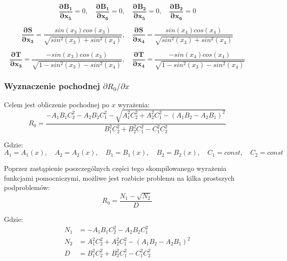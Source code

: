 \documentclass[10pt]{article}
\begin{document}
\begin{equation}
\boldsymbol{\frac{\partial B_1}{\partial x_5}} = 0, \quad
\boldsymbol{\frac{\partial B_1}{\partial x_6}} = 0, \quad
\boldsymbol{\frac{\partial B_2}{\partial x_5}} = 0, \quad
\boldsymbol{\frac{\partial B_2}{\partial x_6}} = 0
\end{equation}

\begin{equation}
\boldsymbol{\frac{\partial S}{\partial x_3}} = \frac{sin(x_3) cos(x_3)}{\sqrt{ sin^2(x_3) + sin^2(x_4)} }, \quad
\boldsymbol{\frac{\partial S}{\partial x_4}} = \frac{sin(x_4) cos(x_4)}{\sqrt{ sin^2(x_3) + sin^2(x_4)} }
\end{equation}

\begin{equation}
\boldsymbol{\frac{\partial T}{\partial x_3}} = \frac{-sin(x_3) cos(x_3)}{\sqrt{1 - sin^2(x_3) - sin^2(x_4)} }, \quad
\boldsymbol{\frac{\partial T}{\partial x_4}} = \frac{-sin(x_4) cos(x_4)}{\sqrt{1 - sin^2(x_3) - sin^2(x_4)} }
\end{equation}

\newpage
\subsubsection*{Wyznaczenie pochodnej $\partial R_0 / \partial x$}

Celem jest obliczenie pochodnej po $x$ wyrażenia:
\begin{equation}
R_0 = \frac{-A_1B_1C_2^2 -A_2B_2C_1^2 - 
\sqrt{A_1^2C_2^2 + A_2^2C_1^2 - ( A_1B_2 - A_2B_1)^2}}
{B_1^2C_2^2 + B_2^2C_1^2 - C_1^2C_2^2}
\end{equation}

Gdzie:
\begin{equation}
A_1 = A_1(x), \quad
A_2 = A_2(x), \quad
B_1 = B_1(x), \quad
B_2 = B_2(x), \quad
C_1 = const, \quad
C_2 = const
\end{equation}

Poprzez zastąpienie poszczególnych części tego skompilowanego wyrażenia funkcjami pomocniczymi, możliwe jest rozbicie problemu na kilka prostszych podproblemów:
\begin{equation}
R_0 = \frac{N_1-\sqrt{N_2}}{D}
\end{equation}

Gdzie:
\begin{equation}
\begin{split}
N_1 &= -A_1 B_1 C_2^2 - A_2 B_2 C_1^2 \\
N_2 &= A_1^2C_2^2 + A_2^2C_1^2 - ( A_1B_2 - A_2B_1)^2 \\
D &= B_1^2 C_2^2 + B_2^2 C_1^2 - C_1^2 C_2^2
\end{split}
\end{equation}
\end{document}
